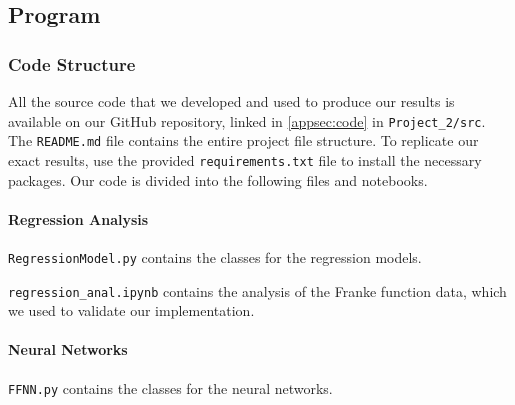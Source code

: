 \documentclass[aps,pra,english,notitlepage,reprint,nofootinbib]{revtex4-1}  %
\begin{document}



\subsection{Program}\label{sec:program}
\subsubsection{Code Structure}\label{subsec:codestructure}
All the source code that we developed and used to produce our results is available on our GitHub repository, linked in \cref{appsec:code} in \verb|Project_2/src|. The \verb|README.md| file contains the entire project file structure. To replicate our exact results, use the provided \verb|requirements.txt| file to install the necessary packages. Our code is divided into the following files and notebooks.

\paragraph*{Regression Analysis}
\verb|RegressionModel.py| contains the classes for the regression models.

\verb|regression_anal.ipynb| contains the analysis of the Franke function data, which we used to validate our implementation.

\paragraph*{Neural Networks}
\verb|FFNN.py| contains the classes for the neural networks.
\end{document}
